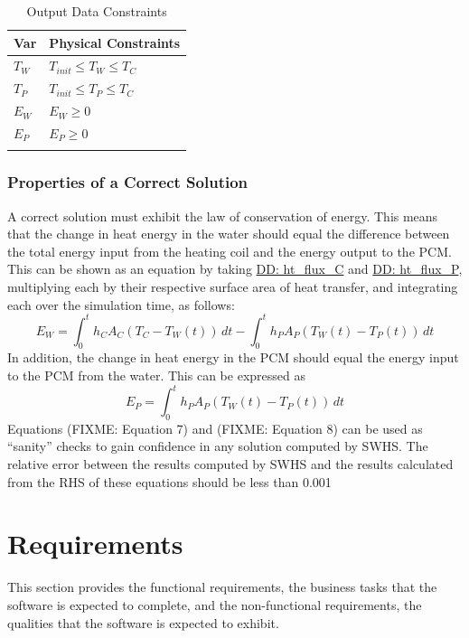 \documentclass[12pt]{article}
\begin{document}
\begin{longtable}{l l}
\toprule
Var & Physical Constraints
\\
\midrule
${T_{W}}$ & ${T_{init}}\leq{}{T_{W}}\leq{}{T_{C}}$
\\
${T_{P}}$ & ${T_{init}}\leq{}{T_{P}}\leq{}{T_{C}}$
\\
${E_{W}}$ & ${E_{W}}\geq{}0$
\\
${E_{P}}$ & ${E_{P}}\geq{}0$
\\
\bottomrule
\caption{Output Data Constraints}
\label{Table:OutDataConstraints}
\end{longtable}
\subsubsection{Properties of a Correct Solution}
\label{Sec:CorSolProps}
A correct solution must exhibit the law of conservation of energy. This means that the change in heat energy in the water should equal the difference between the total energy input from the heating coil and the energy output to the PCM. This can be shown as an equation by taking \hyperref[DD:ht.flux.C]{DD: ht\_flux\_C} and \hyperref[DD:ht.flux.P]{DD: ht\_flux\_P}, multiplying each by their respective surface area of heat transfer, and integrating each over the simulation time, as follows:
\begin{dmath}
{E_{W}}=\int_{0}^{t}{{h_{C}} {A_{C}} \left({T_{C}}-{T_{W}}\left(t\right)\right)}\,dt-\int_{0}^{t}{{h_{P}} {A_{P}} \left({T_{W}}\left(t\right)-{T_{P}}\left(t\right)\right)}\,dt
\end{dmath}
In addition, the change in heat energy in the PCM should equal the energy input to the PCM from the water. This can be expressed as
\begin{dmath}
{E_{P}}=\int_{0}^{t}{{h_{P}} {A_{P}} \left({T_{W}}\left(t\right)-{T_{P}}\left(t\right)\right)}\,dt
\end{dmath}
Equations (FIXME: Equation 7) and (FIXME: Equation 8) can be used as ``sanity'' checks to gain confidence in any solution computed by SWHS. The relative error between the results computed by SWHS and the results calculated from the RHS of these equations should be less than 0.001%
\section{Requirements}
\label{Sec:Requirements}
This section provides the functional requirements, the business tasks that the software is expected to complete, and the non-functional requirements, the qualities that the software is expected to exhibit.
\end{document}
